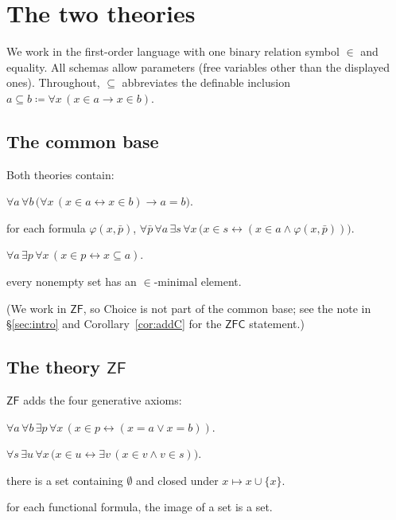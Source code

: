\documentclass[11pt]{article}
\theoremstyle{plain}
\theoremstyle{definition}
\newcommand{\ZF}{\mathsf{ZF}}
\renewcommand{\ZF}{\textsf{ZF}}
\newcommand{\ZFC}{\textsf{ZFC}}
\begin{document}
\section{The two theories}\label{sec:theories}

We work in the first-order language with one binary relation symbol $\in$ and
equality. All schemas allow parameters (free variables other than the displayed
ones). Throughout, $\subseteq$ abbreviates the definable inclusion
$a \subseteq b \coloneqq \forall x\,(x \in a \to x \in b)$.

\subsection{The common base}

Both theories contain:

\begin{description}[leftmargin=2.2em,style=nextline]
\item[Extensionality] $\forall a\,\forall b\,\bigl(\forall x\,(x\in a \leftrightarrow x\in b)\to a=b\bigr)$.
\item[Separation (schema)] for each formula $\varphi(x,\bar p)$,
  $\forall \bar p\,\forall a\,\exists s\,\forall x\,\bigl(x\in s \leftrightarrow (x\in a \wedge \varphi(x,\bar p))\bigr)$.
\item[Powerset] $\forall a\,\exists p\,\forall x\,(x\in p \leftrightarrow x \subseteq a)$.
\item[Regularity] every nonempty set has an $\in$-minimal element.
\end{description}

(We work in $\ZF$, so Choice is not part of the common base; see the note in
\S\ref{sec:intro} and Corollary~\ref{cor:addC} for the $\ZFC$ statement.)

\subsection{The theory $\ZF$}

$\ZF$ adds the four generative axioms:

\begin{description}[leftmargin=2.2em,style=nextline]
\item[Pairing] $\forall a\,\forall b\,\exists p\,\forall x\,(x\in p \leftrightarrow (x=a \vee x=b))$.
\item[Union] $\forall s\,\exists u\,\forall x\,\bigl(x\in u \leftrightarrow \exists v\,(x\in v \wedge v\in s)\bigr)$.
\item[Infinity] there is a set containing $\emptyset$ and closed under $x \mapsto x\cup\{x\}$.
\item[Replacement (schema)] for each functional formula, the image of a set is a set.
\end{description}
\end{document}
